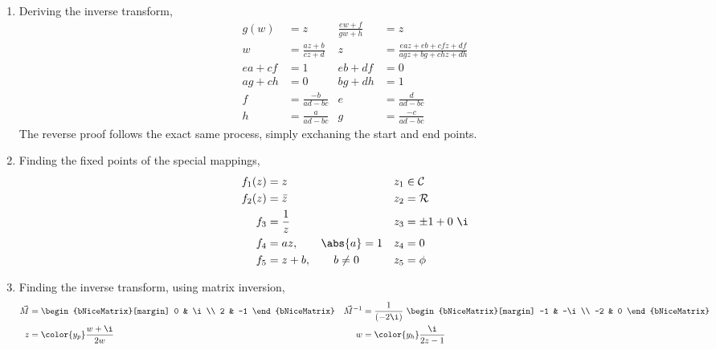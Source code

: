 \begin{enumerate}
    \item Deriving the inverse transform,
          \begin{align}
              g(w)                  & = z                          &
              \frac{ew + f}{gw + h} & = z                            \\
              w                     & = \frac{az + b}{cz + d}      &
              z                     & = \frac{eaz + eb + cfz + df}
              {agz + bg + chz + dh}                                  \\
              ea + cf               & = 1                          &
              eb + df               & = 0                            \\
              ag + ch               & = 0                          &
              bg + dh               & = 1                            \\
              f                     & = \frac{-b}{ad - bc}         &
              e                     & = \frac{d}{ad - bc}            \\
              h                     & = \frac{a}{ad - bc}          &
              g                     & = \frac{-c}{ad - bc}
          \end{align}
          The reverse proof follows the exact same process, simply exchaning the start
          and end points.

    \item Finding the fixed points of the special mappings,
          \begin{align}
              f_1(z) & = z                      & z_1 & \in \mathcal{C} \\
              f_2(z) & = \bar{z}                & z_2 & = \mathcal{R}   \\
              f_3    & = \frac{1}{z}            & z_3 & = \pm 1 + 0\ \i \\
              f_4    & = az, \qquad \abs{a} = 1 & z_4 & = 0             \\
              f_5    & = z + b, \qquad b \neq 0 & z_5 & = \phi
          \end{align}

    \item Finding the inverse transform, using matrix inversion,
          \begin{align}
              \vec{M}      & = \begin{bNiceMatrix}[margin]
                                   0 & \i \\ 2 & -1
                               \end{bNiceMatrix}                   &
              \vec{M}^{-1} & = \frac{1}{(-2\i)}\ \begin{bNiceMatrix}[margin]
                                                     -1 & -\i \\ -2 & 0
                                                 \end{bNiceMatrix}    \\
              z            & = \color{y_p} \frac{w + \i}{2w}                 &
              w            & = \color{y_h} \frac{\i}{2z - 1}
          \end{align}


\end{enumerate}

